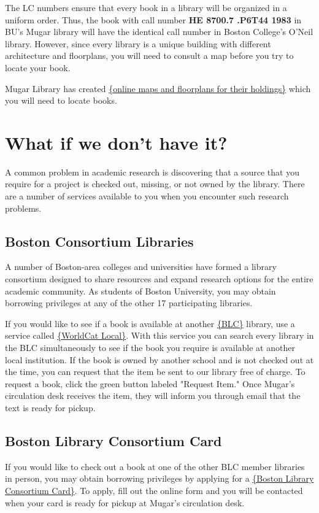 \documentclass[book]{memoir}
\begin{document}
The LC numbers ensure that every book in a library will be organized in a uniform order. Thus, the book with call number \textbf{HE 8700.7 .P6T44 1983} in BU's Mugar library will have the identical call number in Boston College's O'Neil library. However, since every library is a unique building with different architecture and floorplans, you will need to consult a map before you try to locate your book.

Mugar Library has created \href{http://www.bu.edu/library/mugar-memorial/about/floorplans/#f=floor-1}{\{online maps and floorplans for their holdings\}} which you will need to locate books. 

\section{What if we don't have it?}
    
A common problem in academic research is discovering that a source that you require for a project is checked out, missing, or not owned by the library. There are a number of services available to you when you encounter such research problems.

\subsection{Boston Consortium Libraries}

A number of Boston-area colleges and universities have formed a library consortium designed to share resources and expand research options for the entire academic community. As students of Boston University, you may obtain borrowing privileges at any of the other 17 participating libraries. 

If you would like to see if a book is available at another \href{http://www.blc.org/members/current-members}{\{BLC\}} library, use a service called \href{http://www.bu.worldcat.org}{\{WorldCat Local\}}. With this service you can search every library in the BLC simultaneously to see if the book you require is available at another local institution. If the book is owned by another school and is not checked out at the time, you can request that the item be sent to our library free of charge. To request a book, click the green button labeled "Request Item." Once Mugar's circulation desk receives the item, they will inform you through email that the text is ready for pickup.

\subsection{Boston Library Consortium Card}
If you would like to check out a book at one of the other BLC member libraries in person, you may obtain borrowing privileges by applying for a \href{http://www.bu.edu/library/services/ill/blc-cards}{\{Boston Library Consortium Card\}}. To apply, fill out the online form and you will be contacted when your card is ready for pickup at Mugar's circulation desk.
\end{document}

